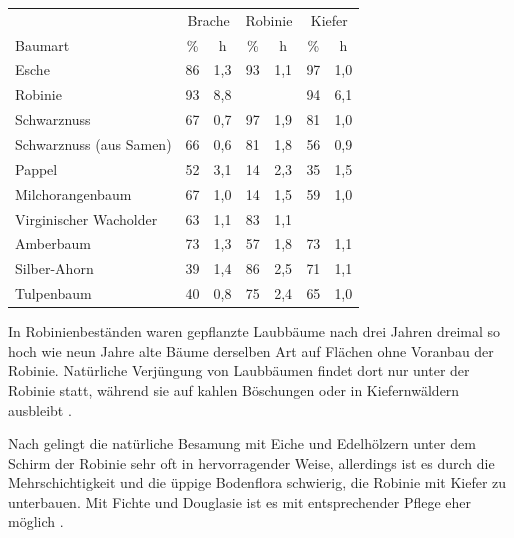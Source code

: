 \documentclass[twocolumn]{scrartcl}
\begin{document}
\begin{table}[htbp]
\centering
\begin{tabular}{lcc|cc|cc}
   & \multicolumn{2}{c}{Brache} & \multicolumn{2}{c}{Robinie} & \multicolumn{2}{c}{Kiefer} \\
  Baumart & \% & h & \% & h & \% & h \\
  \hline
Esche                    & 86 & 1,3 & 93 & 1,1 & 97 & 1,0 \\
Robinie                  & 93 & 8,8 &  &  & 94 & 6,1 \\
Schwarznuss              & 67 & 0,7 & 97 & 1,9 & 81 & 1,0 \\
Schwarznuss (aus Samen)  & 66 & 0,6 & 81 & 1,8 & 56 & 0,9 \\
Pappel                   & 52 & 3,1 & 14 & 2,3 & 35 & 1,5 \\
Milchorangenbaum         & 67 & 1,0 & 14 & 1,5 & 59 & 1,0 \\
Virginischer Wacholder   & 63 & 1,1 & 83 & 1,1 &  &  \\
Amberbaum                & 73 & 1,3 & 57 & 1,8 & 73 & 1,1 \\
Silber-Ahorn             & 39 & 1,4 & 86 & 2,5 & 71 & 1,1 \\
Tulpenbaum               & 40 & 0,8 & 75 & 2,4 & 65 & 1,0 \\
\end{tabular}
  \label{tab:zuwachsUnterbau3}
\end{table}

In Robinienbeständen waren gepflanzte Laubbäume nach drei Jahren
dreimal so hoch wie neun Jahre alte Bäume derselben Art auf Flächen
ohne Voranbau der Robinie. Natürliche Verjüngung von Laubbäumen findet
dort nur unter der Robinie statt, während sie auf kahlen Böschungen
oder in Kiefernwäldern ausbleibt \citep{chapman1947robinie}.

Nach \citet[S.~19]{erteld1952robinieErtrag} gelingt die natürliche
Besamung mit Eiche und Edelhölzern unter dem Schirm der Robinie sehr
oft in hervorragender Weise, allerdings ist es durch die
Mehrschichtigkeit und die üppige Bodenflora schwierig, die Robinie mit
Kiefer zu unterbauen. Mit Fichte und Douglasie ist es mit
entsprechender Pflege eher möglich
\citep[S.~94]{erteld1952robinieErtrag}.
\end{document}
